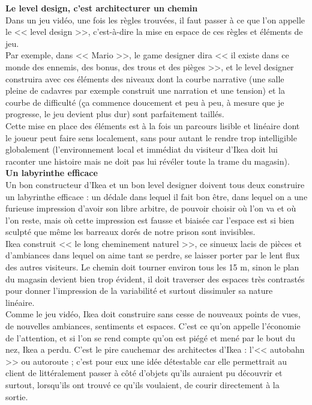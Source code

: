 \documentclass[11pt,twoside,a4paper]{article}
\begin{document}
\textbf{\large Le level design, c'est architecturer un chemin}~\\

Dans un jeu vid{\'e}o, une fois les r{\`e}gles trouv{\'e}es, il faut passer {\`a} ce que l'on appelle le << level design >>, c'est-{\`a}-dire la mise en espace de ces r{\`e}gles et {\'e}l{\'e}ments de jeu.~\\

Par exemple, dans << Mario >>, le game designer dira << il existe dans ce monde des ennemis, des bonus, des trous et des pi{\`e}ges >>, et le level designer construira avec ces {\'e}l{\'e}ments des niveaux dont la courbe narrative (une salle pleine de cadavres par exemple construit une narration et une tension) et la courbe de difficult{\'e} (\c{c}a commence doucement et peu {\`a} peu, {\`a} mesure que je progresse, le jeu devient plus dur) sont parfaitement taill{\'e}s.~\\

Cette mise en place des {\'e}l{\'e}ments est {\`a} la fois un parcours lisible et lin{\'e}aire dont le joueur peut faire sens localement, sans pour autant le rendre trop intelligible globalement (l'environnement local et imm{\'e}diat du visiteur d'Ikea doit lui raconter une histoire mais ne doit pas lui r{\'e}v{\'e}ler toute la trame du magasin).~\\

\textbf{\large Un labyrinthe efficace}~\\

Un bon constructeur d'Ikea et un bon level designer doivent tous deux construire un labyrinthe efficace : un d{\'e}dale dans lequel il fait bon {\^e}tre, dans lequel on a une furieuse impression d'avoir son libre arbitre, de pouvoir choisir o{\`u} l'on va et o{\`u} l'on reste, mais o{\`u} cette impression est fausse et biais{\'e}e car l'espace est si bien sculpt{\'e} que m{\^e}me les barreaux dor{\'e}s de notre prison sont invisibles.~\\

Ikea construit << le long cheminement naturel >>, ce sinueux lacis de pi{\`e}ces et d'ambiances dans lequel on aime tant se perdre, se laisser porter par le lent flux des autres visiteurs. Le chemin doit tourner environ tous les 15 m, sinon le plan du magasin devient bien trop {\'e}vident, il doit traverser des espaces tr{\`e}s contrast{\'e}s pour donner l'impression de la variabilit{\'e} et surtout dissimuler sa nature lin{\'e}aire.~\\

Comme le jeu vid{\'e}o, Ikea doit construire sans cesse de nouveaux points de vues, de nouvelles ambiances, sentiments et espaces. C'est ce qu'on appelle l'{\'e}conomie de l'attention, et si l'on se rend compte qu'on est pi{\'e}g{\'e} et men{\'e} par le bout du nez, Ikea a perdu. C'est le pire cauchemar des architectes d'Ikea : l'<< autobahn >> ou autoroute ; c'est pour eux une id{\'e}e d{\'e}testable car elle permettrait au client de litt{\'e}ralement passer {\`a} c{\^o}t{\'e} d'objets qu'ils auraient pu d{\'e}couvrir et surtout, lorsqu'ils ont trouv{\'e} ce qu'ils voulaient, de courir directement {\`a} la sortie.~\\
\end{document}
